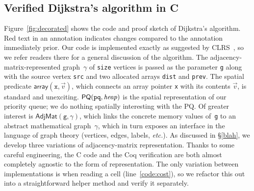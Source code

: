 \subsection{Verified Dijkstra's algorithm in C}
\label{sec:dijkoverview}

Figure~\ref{fig:decorated} shows the code and proof
sketch of Dijkstra's algorithm.  
{\color{red}Red} text in an annotation indicates changes compared to the
annotation immediately prior.
Our code is implemented exactly
as suggested by CLRS~\cite{clrs}, so we refer readers there for a
general discussion of the algorithm.
The adjacency-matrix-represented graph~$\gamma$ of \texttt{size} vertices
is passed as the parameter \texttt{g} along with the source vertex \texttt{src}
and two allocated arrays \texttt{dist} and \texttt{prev}.
The spatial predicate $\mathsf{array}(\texttt{x},\vec{v})$, which connects 
an array pointer \texttt{x} with its contents $\vec{v}$, is standard and unexciting.
$\mathsf{PQ}(\texttt{pq},\mathit{heap})$ is the spatial 
representation of our priority queue;
we do nothing spatially interesting with the PQ.
Of greater interest is $\mathsf{AdjMat}(\texttt{g},\gamma)$, which
links the concrete memory values of~\texttt{g} to an abstract mathematical
graph~$\gamma$, which in turn exposes an interface in the 
language of graph theory (vertices, edges, labels, \emph{etc.}).
As discussed in \S\ref{blah}, we develop three variations of 
adjacency-matrix representation. 
Thanks to some careful engineering, the C code and 
the Coq verification are both almost completely agnostic to 
the form of representation. The only variation between implementations 
is when reading a cell (line~\ref{code:cost}), so we 
refactor this out into a straightforward helper method and 
verify it separately.





